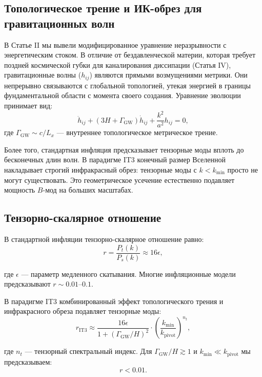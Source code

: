\documentclass[12pt,a4paper]{article}
\begin{document}
\subsection{Топологическое трение и ИК-обрез для гравитационных волн}

В Статье II мы вывели модифицированное уравнение неразрывности с энергетическим стоком. В отличие от бездавленческой материи, которая требует поздней космической губки для каналирования диссипации (Статья IV), гравитационные волны ($h_{ij}$) являются прямыми возмущениями метрики. Они непрерывно связываются с глобальной топологией, утекая энергией в границы фундаментальной области с момента своего создания. Уравнение эволюции принимает вид:
\begin{equation}
\ddot{h}_{ij} + (3H + \Gamma_{\mathrm{GW}}) \dot{h}_{ij} + \frac{k^2}{a^2} h_{ij} = 0,
\label{eq:tensor}
\end{equation}
где $\Gamma_{\mathrm{GW}} \sim c/L_x$ — внутреннее топологическое метрическое трение.

Более того, стандартная инфляция предсказывает тензорные моды вплоть до бесконечных длин волн. В парадигме IT3 конечный размер Вселенной накладывает строгий инфракрасный обрез: тензорные моды с $k < k_{\mathrm{min}}$ просто не могут существовать. Это геометрическое усечение естественно подавляет мощность $B$-мод на больших масштабах.

\subsection{Тензорно-скалярное отношение}

В стандартной инфляции тензорно-скалярное отношение равно:
\begin{equation}
r = \frac{P_t(k)}{P_s(k)} \approx 16\epsilon,
\end{equation}

где $\epsilon$ — параметр медленного скатывания. Многие инфляционные модели предсказывают $r \sim 0.01\text{--}0.1$.

В парадигме IT3 комбинированный эффект топологического трения и инфракрасного обреза подавляет тензорные моды:
\begin{equation}
r_{\mathrm{IT3}} \approx \frac{16\epsilon}{1 + (\Gamma_{\mathrm{GW}}/H)^2} \cdot \left(\frac{k_{\min}}{k_{\mathrm{pivot}}}\right)^{n_t},
\end{equation}

где $n_t$ — тензорный спектральный индекс. Для $\Gamma_{\mathrm{GW}}/H \gtrsim 1$ и $k_{\min} \ll k_{\mathrm{pivot}}$ мы предсказываем:
\begin{equation}
r < 0.01.
\end{equation}
\end{document}
